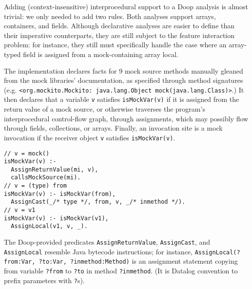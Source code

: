
Adding (context-insensitive) interprocedural support to a Doop analysis is almost trivial: we only needed to add two rules.
Both analyses support arrays, containers, and fields. Although declarative analyses are easier to define than their imperative counterparts, they are still subject to the feature interaction problem: for instance, they still must specifically handle the case where an array-typed field is assigned from a mock-containing array local.

The implementation declares facts for 9 mock source methods manually gleaned from the mock libraries' documentation, as specified through method signatures (e.g. 
\texttt{<org.mockito.Mockito: java.lang.Object mock(java.lang.Class)>}.)
It then declares that a variable {\tt v} satisfies \verb+isMockVar(v)+ if it is assigned from the return value of a mock source, or otherwise traverses the program's interprocedural control-flow graph, through assignments, which may possibly flow through fields, collections, or arrays. Finally, an invocation site is a mock invocation if the receiver object {\tt v} satisfies \verb+isMockVar(v)+.

\begin{lstlisting}[basicstyle=\ttfamily\small,numbers=none,label={lst:core},caption={Selected rules for Datalog mock analysis}]
// v = mock()
isMockVar(v) :-
  AssignReturnValue(mi, v),
  callsMockSource(mi).
// v = (type) from
isMockVar(v) :- isMockVar(from),
  AssignCast(_/* type */, from, v, _/* inmethod */).
// v = v1
isMockVar(v) :- isMockVar(v1),
  AssignLocal(v1, v, _).
\end{lstlisting}

The Doop-provided predicates \texttt{AssignReturnValue}, \texttt{AssignCast}, and \texttt{AssignLocal} resemble Java bytecode instructions; for instance, \texttt{AssignLocal(?from:Var, ?to:Var, ?inmethod:Method)} is an assignment statement copying from variable \texttt{?from} to \texttt{?to} in method \texttt{?inmethod}. (It is Datalog convention to prefix parameters with \texttt{?}s).

